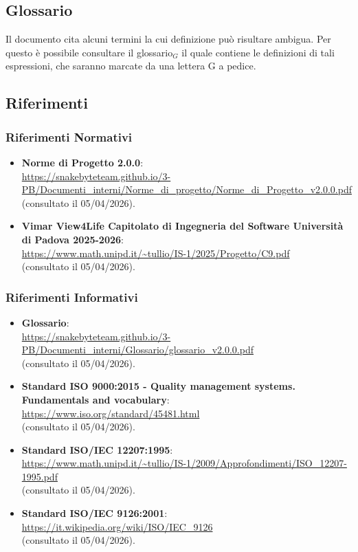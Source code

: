 \documentclass[10pt, letterpaper]{article}
\begin{document}
\subsection{Glossario}
Il documento cita alcuni termini la cui definizione può risultare ambigua. Per questo è possibile consultare
il glossario${_G}$ il quale contiene le definizioni di tali espressioni, che saranno marcate da una lettera G a
pedice.
\subsection{Riferimenti}
\subsubsection{Riferimenti Normativi}
\begin{itemize}
    \item \textbf{Norme di Progetto 2.0.0}:
          \\ \url{https://snakebyteteam.github.io/3-PB/Documenti_interni/Norme_di_progetto/Norme_di_Progetto_v2.0.0.pdf}
          \\ (consultato il 05/04/2026).
    \item \textbf{Vimar View4Life Capitolato di Ingegneria del Software Università di Padova 2025-2026}:
          \\ \url{https://www.math.unipd.it/~tullio/IS-1/2025/Progetto/C9.pdf}
          \\ (consultato il 05/04/2026).
\end{itemize}
\subsubsection{Riferimenti Informativi}
\begin{itemize}
    \item \textbf{Glossario}:
          \\ \url{https://snakebyteteam.github.io/3-PB/Documenti_interni/Glossario/glossario_v2.0.0.pdf}
          \\ (consultato il 05/04/2026).
    \item \textbf{Standard ISO 9000:2015 - Quality management systems. Fundamentals and vocabulary}:
          \\ \url{https://www.iso.org/standard/45481.html}
          \\ (consultato il 05/04/2026).
    \item \textbf{Standard ISO/IEC 12207:1995}:
          \\ \url{https://www.math.unipd.it/~tullio/IS-1/2009/Approfondimenti/ISO_12207-1995.pdf}
          \\ (consultato il 05/04/2026).
    \item \textbf{Standard ISO/IEC 9126:2001}:
          \\ \url{https://it.wikipedia.org/wiki/ISO/IEC_9126}
          \\ (consultato il 05/04/2026).
\end{itemize}
\end{document}
